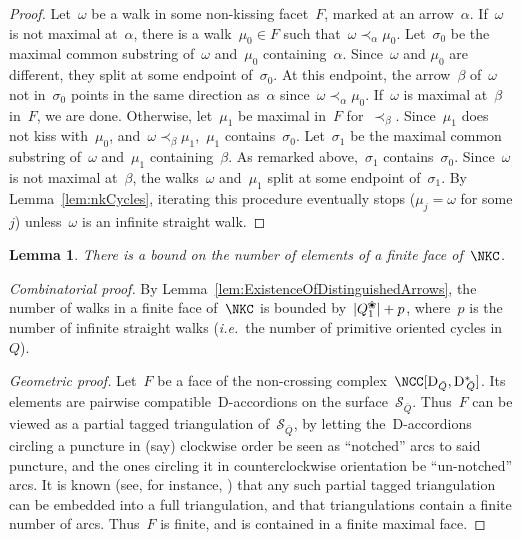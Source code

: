 \documentclass{amsart}
\newtheorem{lemma}[theorem]{Lemma}
\theoremstyle{definition}
\newcommand{\ie}{\textit{i.e.}~} %
\newcommand{\para}[1]{\medskip\noindent\textit{#1.}} %
\newcommand{\blossom}{^\text{\ding{96}}} %
\newcommand{\surface}{\mathcal{S}} %
\newcommand{\dual}{^*} %
\newcommand{\dissection}{\mathrm{D}} %
\begin{document}
\begin{proof}
Let~$\omega$ be a walk in some non-kissing facet~$F$, marked at an arrow~$\alpha$.
If~$\omega$ is not maximal at~$\alpha$, there is a walk~$\mu_0\in F$ such that~$\omega\prec_\alpha \mu_0$.
Let~$\sigma_0$ be the maximal common substring of~$\omega$ and~$\mu_0$ containing~$\alpha$.
Since~$\omega$ and $\mu_0$ are different, they split at some endpoint of~$\sigma_0$.
At this endpoint, the arrow~$\beta$ of~$\omega$ not in~$\sigma_0$ points in the same direction as~$\alpha$ since~$\omega \prec_\alpha \mu_0$.
If~$\omega$ is maximal at~$\beta$ in~$F$, we are done.
Otherwise, let~$\mu_1$ be maximal in~$F$ for~$\prec_\beta$.
Since~$\mu_1$ does not kiss with~$\mu_0$, and~$\omega\prec_\beta\mu_1$,~$\mu_1$ contains~$\sigma_0$.
Let~$\sigma_1$ be the maximal common substring of~$\omega$ and~$\mu_1$ containing~$\beta$.
As remarked above,~$\sigma_1$ contains~$\sigma_0$.
Since~$\omega$ is not maximal at~$\beta$, the walks~$\omega$ and~$\mu_1$ split at some endpoint of~$\sigma_1$.
By Lemma~\ref{lem:nkCycles}, iterating this procedure eventually stops ($\mu_j=\omega$ for some $j$) unless~$\omega$ is an infinite straight walk.
\end{proof}

\begin{lemma}
\label{lemm:facesAreBounded}
There is a bound on the number of elements of a finite face of~$\NKC$.
\end{lemma}

\begin{proof}[Combinatorial proof]
By Lemma~\ref{lem:ExistenceOfDistinguishedArrows}, the number of walks in a finite face of~$\NKC$ is bounded by~$|Q_1\blossom|+p$, where~$p$ is the number of infinite straight walks (\ie the number of primitive oriented cycles in~$Q$).

\para{Geometric proof}
Let~$F$ be a face of the non-crossing complex~$\NCC[\dissection_{\bar Q}, {\dissection\dual\!\!_{\bar Q}}]$.
Its elements are pairwise compatible~$\dissection$-accordions on the surface~$\surface_{\bar Q}$.
Thus~$F$ can be viewed as a partial tagged triangulation of~$\surface_{\bar Q}$, by letting the~$\dissection$-accordions circling a puncture in (say) clockwise order be seen as ``notched'' arcs to said puncture, and the ones circling it in counterclockwise orientation be ``un-notched'' arcs.
It is known (see, for instance, \cite{FominShapiroThurston}) that any such partial tagged triangulation can be embedded into a full triangulation, and that triangulations contain a finite number of arcs.
Thus~$F$ is finite, and is contained in a finite maximal face.
\end{proof}
\end{document}
